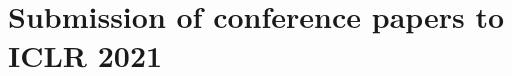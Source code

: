 \documentclass{article} %
\begin{document}
%

%
%
\section{Submission of conference papers to ICLR 2021}
\end{document}
